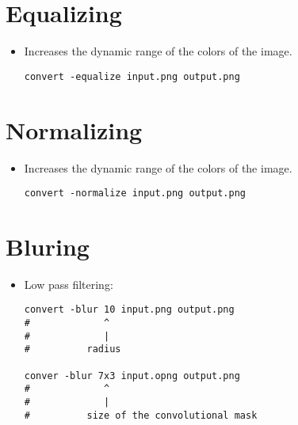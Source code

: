 
\section{Equalizing}

\begin{itemize}
\item Increases the dynamic range of the colors of the image.
\begin{lstlisting}
convert -equalize input.png output.png
\end{lstlisting}

\end{itemize}


\section{Normalizing}

\begin{itemize}
\item Increases the dynamic range of the colors of the image.
\begin{lstlisting}
convert -normalize input.png output.png
\end{lstlisting}

\end{itemize}



\section{Bluring}

\begin{itemize}
\item Low pass filtering:
\begin{lstlisting}
convert -blur 10 input.png output.png
#             ^
#             |
#          radius

conver -blur 7x3 input.opng output.png
#             ^
#             |
#          size of the convolutional mask
\end{lstlisting}
\end{itemize}


